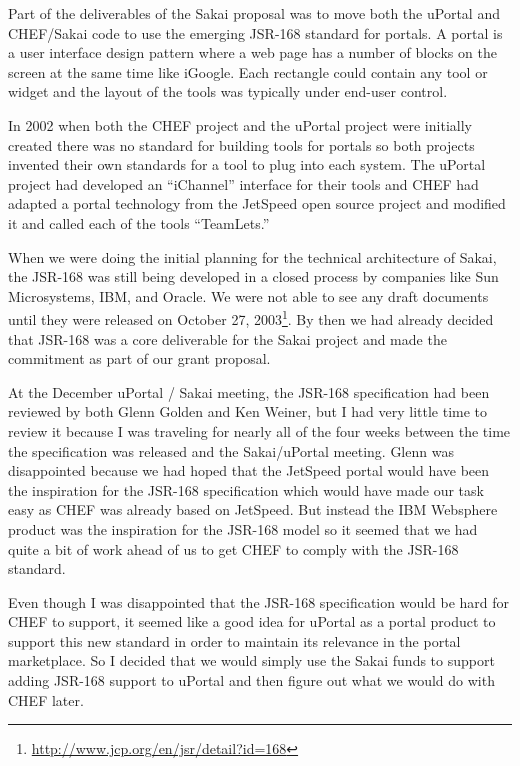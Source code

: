 \documentclass[12pt]{book}
\begin{document}
Part of the deliverables of the Sakai proposal was to move both the uPortal and
CHEF\slash Sakai code to use the emerging JSR-168 standard for portals.  A portal is a
user interface design pattern where a web page has a number of blocks
on the screen at the same time like iGoogle.  Each rectangle could
contain any tool or widget and the layout of the tools was typically
under end-user control.

In 2002 when both the CHEF project and the uPortal project
were initially created there was no standard for building tools for portals
so both projects invented their own standards for a tool to plug into each system.
The uPortal project had developed an ``iChannel'' interface for their tools
and CHEF had adapted a portal technology from the JetSpeed open source project
and modified it and called each of the tools ``TeamLets.''

When we were doing the initial planning for the technical architecture
of Sakai, the JSR-168 was still being developed in a closed
process by companies like Sun Microsystems, IBM, and Oracle.
We were not able to see any draft documents
until they were released on October 27, 2003\footnote{\url{http://www.jcp.org/en/jsr/detail?id=168}}.
By then we had already decided that JSR-168 was a core deliverable
for the Sakai project and made the commitment as part of our grant proposal.

At the December uPortal / Sakai meeting, the JSR-168 specification had been
reviewed by both Glenn Golden
and Ken Weiner,
but I had very little time to review it
because I was traveling for nearly all of the four weeks between the
time the specification was released and the Sakai\slash uPortal meeting.
Glenn was disappointed because we had hoped that the JetSpeed portal would
have been the inspiration for the JSR-168 specification which would have made
our task easy as CHEF was already based on JetSpeed.  But instead the
IBM Websphere product was the inspiration for the JSR-168 model so it seemed
that we had quite a bit of work ahead of us to get CHEF to comply with the
JSR-168 standard.

Even though I was disappointed that the JSR-168 specification would be hard
for CHEF to support, it seemed like a good idea for uPortal as a portal
product to support this new standard in order to maintain its relevance in
the portal marketplace.  So I decided that we would simply use the Sakai funds
to support adding JSR-168 support to uPortal and then figure out what we would
do with CHEF later.
\end{document}
